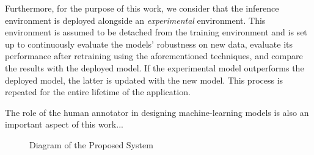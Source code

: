 \documentclass[../main.tex]{subfiles}
\begin{document}
    Furthermore, for the purpose of this work, we consider that the inference environment is deployed alongside an \textit{experimental} environment. This environment is assumed to be detached from the training environment and is set up to continuously evaluate the models' robustness on new data, evaluate its performance after retraining using the aforementioned techniques, and compare the results with the deployed model. If the experimental model outperforms the deployed model, the latter is updated with the new model. This process is repeated for the entire lifetime of the application.


    The role of the human annotator in designing machine-learning models is also an important aspect of this work...

    \begin{figure}[t]
        \centering
        \caption{Diagram of the Proposed System}
        \hspace*{-0.3cm}
        \label{fig:system_proposal_diagram}
    \end{figure}

        
  
\end{document}
